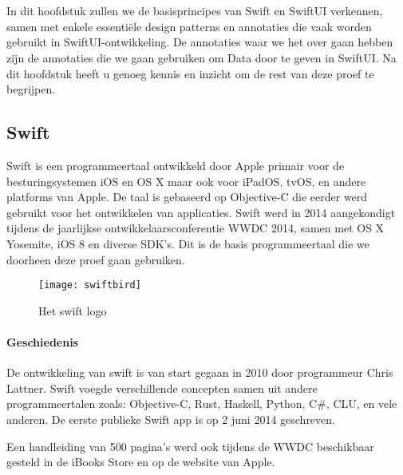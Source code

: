 \chapter{}%
\label{ch:stand-van-zaken}


In dit hoofdstuk zullen we de basisprincipes van Swift en SwiftUI verkennen, samen met enkele essentiële design patterns en annotaties die vaak worden gebruikt in SwiftUI-ontwikkeling. De annotaties waar we het over gaan hebben zijn de annotaties die we gaan gebruiken om Data door te geven in SwiftUI. Na dit hoofdstuk heeft u genoeg kennis en inzicht om de rest van deze proef te begrijpen.

\section{Swift}
\autocite{WikiSwift} Swift is een programmeertaal ontwikkeld door Apple primair voor de besturingsystemen iOS en OS X maar ook voor iPadOS, tvOS, en andere platforms van Apple. De taal is gebaseerd op Objective-C die eerder werd gebruikt voor het ontwikkelen van applicaties. Swift werd in 2014 aangekondigt tijdens de jaarlijkse ontwikkelaarsconferentie WWDC 2014, samen met OS X Yosemite, iOS 8 en diverse SDK's. Dit is de basis programmeertaal die we doorheen deze proef gaan gebruiken.
\begin{figure}[H]
    \centering
    \texttt{[image: swiftbird]} 
    \caption{Het swift logo \autocite{SwiftBirdImage}}
    \label{fig:swift}
\end{figure}
\subsubsection{Geschiedenis}
De ontwikkeling van swift is van start gegaan in 2010 door programmeur Chris Lattner. Swift voegde verschillende concepten samen uit andere programmeertalen zoals: Objective-C, Rust, Haskell, Python, C\#, CLU, en vele anderen. De eerste publieke Swift app is op 2 juni 2014 geschreven.

Een handleiding van 500 pagina's werd ook tijdens de WWDC beschikbaar gesteld in de iBooks Store en op de website van Apple.
